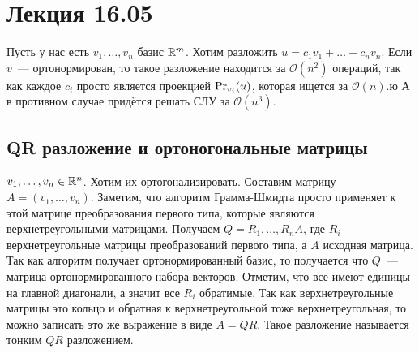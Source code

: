 \section{Лекция 16.05}
\begin{motivation}
    Пусть у нас есть $v_1,\dots, v_n$ базис $\mathbb{R}^m$.
    Хотим разложить $u = c_1 v_1 + \dots + c_n v_n$. Если $v$~--- ортонормирован,
    то такое разложение находится за $\mathcal{O}(n^2)$ операций, так как каждое
    $c_i$ просто является проекцией $\operatorname{Pr}_{v_i}(u)$, которая ищется за $\mathcal{O}(n)$.ю
    А в противном случае придётся решать СЛУ за $\mathcal{O}(n^3)$.
\end{motivation}
\subsection{QR разложение и ортоногональные матрицы}

$v_1,\dots, v_n \in \mathbb{R}^n$. Хотим их ортогонализировать.
Составим матрицу $A = \left(v_1,\dots, v_n\right)$. Заметим, что
алгоритм Грамма-Шмидта просто применяет к этой матрице преобразования
первого типа, которые являются верхнетреугольными матрицами.
Получаем  $Q = R_1,\dots, R_n A$, где $R_i$~--- верхнетреугольные матрицы
преобразований первого типа, а $A$ исходная матрица. Так как алгоритм
получает ортонормированный базис, то получается что $Q$~--- матрица ортонормированного
набора векторов. Отметим, что все имеют единицы на главной диагонали,
а значит все $R_i$ обратимые.
Так как верхнетреугольные матрицы это кольцо и обратная к верхнетреугольной
тоже верхнетреугольная, то можно записать это же
выражение в виде $A = QR$. Такое разложение называется 
тонким $QR$ разложением.

